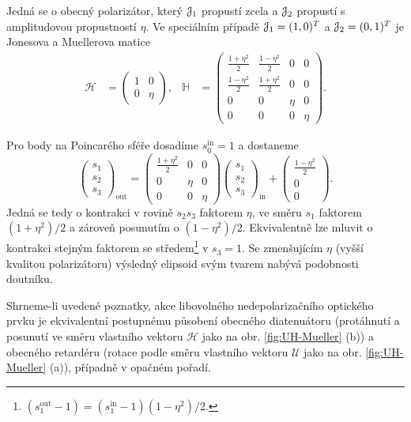 Jedná se o obecný polarizátor, který $\mathcal{J}_1$ propustí zcela a $\mathcal{J}_2$ propustí s amplitudovou propustností $\eta$.
Ve speciálním případě $\mathcal{J}_1=(1,0)^T$ a $\mathcal{J}_2=\allowbreak(0,1)^T$ je Jonesova a Muellerova matice
\begin{align}
    \mathcal{H}
    &=\begin{pmatrix}
        1 & 0 \\ 0 & \eta
        \end{pmatrix} ,
    &\mathbb{H}
    &=\begin{pmatrix}
        \frac{1+\eta^2}{2} & \frac{1-\eta^2}{2} & 0 & 0 \\ \frac{1-\eta^2}{2} & \frac{1+\eta^2}{2} & 0 & 0 \\
        0 & 0 & \eta & 0 \\ 0 & 0 & 0 & \eta
        \end{pmatrix} .
\end{align}

Pro body na Poincarého sféře dosadíme $s_0^\textrm{in}=1$ a dostaneme
\begin{equation}
    \begin{pmatrix} s_1 \\ s_2 \\ s_3 \end{pmatrix}_{\textrm{out}}
    =\begin{pmatrix} \frac{1+\eta^2}{2} & 0 & 0 \\ 0 & \eta & 0 \\ 0 & 0 & \eta \end{pmatrix}
    \begin{pmatrix} s_1 \\ s_2 \\ s_3  \end{pmatrix}_{\textrm{in}}
    +\begin{pmatrix} \frac{1-\eta^2}{2} \\ 0 \\ 0 \end{pmatrix} .
\end{equation}
Jedná se tedy o kontrakci v rovině $s_2s_3$ faktorem $\eta$, ve směru $s_1$ faktorem $(1+\eta^2)/2$ a zároveň posunutím o $(1-\eta^2)/2$.
Ekvivalentně lze mluvit o kontrakci stejným faktorem se středem\footnote{$(s_1^\textrm{out}-1)=(s_1^\textrm{in}-1)(1-\eta^2)/2$.} v $s_3=1$.
Se zmenšujícím $\eta$ (vyšší kvalitou polarizátoru) výsledný elipsoid svým tvarem nabývá podobnosti doutníku.

Shrneme-li uvedené poznatky, akce libovolného nedepolarizačního optického prvku je ekvivalentní postupnému působení obecného diatenuátoru (protáhnutí a posunutí ve směru vlastního vektoru $\mathcal{H}$ jako na obr. \ref{fig:UH-Mueller} (b)) a obecného retardéru (rotace podle směru vlastního vektoru $\mathcal{U}$ jako na obr. \ref{fig:UH-Mueller} (a)), případně v opačném pořadí.

